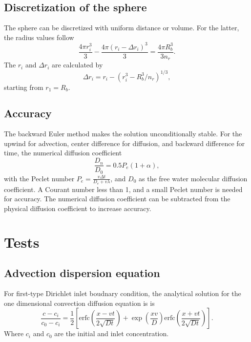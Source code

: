 \documentclass{article}
\begin{document}
\subsection{Discretization of the sphere}
The sphere can be discretized with uniform distance or volume. For the latter, the radius values follow
\begin{equation}
\frac{4\pi r_i^3}{3} - \frac{4\pi (r_i-\Delta r_i)^3}{3} = \frac{4\pi R_b^3}{3n_r}.
\end{equation}
The $r_i$ and $\Delta r_i$ are calculated by
\begin{equation}
\Delta r_i = r_i - (r_i^3 - R_b^3/n_r)^{1/3},
\end{equation}
starting from $r_1 = R_b$.

\subsection{Accuracy}
The backward Euler method makes the solution unconditionally stable.
For the upwind for advection, center difference for diffusion, and backward difference for time, the numerical diffusion coefficient
\begin{equation}
\frac{D_n}{D_0} = 0.5 P_e (1 + \alpha),
\end{equation}
with the Peclet number $P_e=\frac{v \Delta t}{D_e+v\lambda}$, and $D_0$ as the free water molecular diffusion coefficient. A Courant number less than 1, and a small Peclet number is needed for accuracy. The numerical diffusion coefficient can be subtracted from the physical diffusion coefficient to increase accuracy.

\section{Tests}
\subsection{Advection dispersion equation}
For first-type Dirichlet inlet boudnary condition, the analytical solution for the one dimensional convection diffusion equation is is \cite{Lapidus1952,Ogata1961}
\begin{equation}
\frac{c-c_i}{c_0-c_i} = \frac{1}{2}\left[\mathrm{erfc}\left(\frac{x-vt}{2\sqrt{Dt}}\right) + \exp\left(\frac{xv}{D}\right)\mathrm{erfc}\left(\frac{x+vt}{2\sqrt{Dt}}\right)\right].
\end{equation}
Where $c_i$ and $c_0$ are the initial and inlet concentration.
\end{document}
